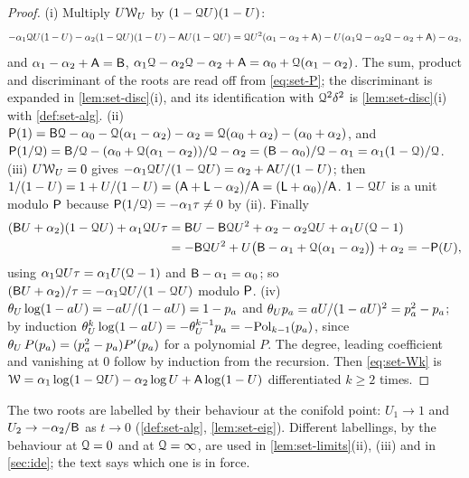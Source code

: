 \begin{proof}
(i) Multiply $U\mathcal{W}_U$ by $(1-\mathcal{Q} U)(1-U)$:
\[
-\alpha_1\mathcal{Q} U(1-U)-\alpha_2(1-\mathcal{Q} U)(1-U)-\mathsf{A} U(1-\mathcal{Q} U)
=\mathcal{Q} U^2(\alpha_1-\alpha_2+\mathsf{A})-U(\alpha_1\mathcal{Q}-\alpha_2\mathcal{Q}-\alpha_2+\mathsf{A})-\alpha_2 ,
\]
and $\alpha_1-\alpha_2+\mathsf{A}=\mathsf{B}$, $\alpha_1\mathcal{Q}-\alpha_2\mathcal{Q}-\alpha_2+\mathsf{A}=\alpha_0+\mathcal{Q}(\alpha_1-\alpha_2)$.  The sum, product and discriminant of the roots are read off from \eqref{eq:set-P}; the discriminant is expanded in \cref{lem:set-disc}(i), and its identification with $\mathcal{Q}^2\delta^2$ is \cref{lem:set-disc}(i) with \cref{def:set-alg}.
(ii) $\mathsf{P}(1)=\mathsf{B}\mathcal{Q}-\alpha_0-\mathcal{Q}(\alpha_1-\alpha_2)-\alpha_2=\mathcal{Q}(\alpha_0+\alpha_2)-(\alpha_0+\alpha_2)$, and $\mathsf{P}(1/\mathcal{Q})=\mathsf{B}/\mathcal{Q}-(\alpha_0+\mathcal{Q}(\alpha_1-\alpha_2))/\mathcal{Q}-\alpha_2=(\mathsf{B}-\alpha_0)/\mathcal{Q}-\alpha_1=\alpha_1(1-\mathcal{Q})/\mathcal{Q}$.
(iii) $U\mathcal{W}_U=0$ gives $-\alpha_1\mathcal{Q} U/(1-\mathcal{Q} U)=\alpha_2+\mathsf{A} U/(1-U)$; then $1/(1-U)=1+U/(1-U)=(\mathsf{A}+\mathsf{L}-\alpha_2)/\mathsf{A}=(\mathsf{L}+\alpha_0)/\mathsf{A}$. $1-\mathcal{Q} U$ is a unit modulo $\mathsf{P}$ because $\mathsf{P}(1/\mathcal{Q})=-\alpha_1\tau\neq0$ by (ii). Finally
\begin{align*}
(\mathsf{B} U+\alpha_2)(1-\mathcal{Q} U)+\alpha_1\mathcal{Q} U\tau&=\mathsf{B} U-\mathsf{B}\mathcal{Q} U^2+\alpha_2-\alpha_2\mathcal{Q} U+\alpha_1U(\mathcal{Q}-1)\\
&=-\mathsf{B}\mathcal{Q} U^2+U\big(\mathsf{B}-\alpha_1+\mathcal{Q}(\alpha_1-\alpha_2)\big)+\alpha_2=-\mathsf{P}(U),
\end{align*}
using $\alpha_1\mathcal{Q} U\tau=\alpha_1U(\mathcal{Q}-1)$ and $\mathsf{B}-\alpha_1=\alpha_0$; so $(\mathsf{B} U+\alpha_2)/\tau=-\alpha_1\mathcal{Q} U/(1-\mathcal{Q} U)$ modulo $\mathsf{P}$.
(iv) $\theta_{U}\log(1-aU)=-aU/(1-aU)=1-p_a$ and $\theta_{U} p_a=aU/(1-aU)^2=p_a^2-p_a$; by induction $\theta_{U}^k\log(1-aU)=-\theta_{U}^{k-1}p_a=-\mathrm{Pol}_{k-1}(p_a)$, since $\theta_{U}\,P(p_a)=(p_a^2-p_a)P'(p_a)$ for a polynomial $P$. The degree, leading coefficient and vanishing at $0$ follow by induction from the recursion. Then \eqref{eq:set-Wk} is $\mathcal{W}=\alpha_1\log(1-\mathcal{Q} U)-\alpha_2\log U+\mathsf{A}\log(1-U)$ differentiated $k\geq2$ times.
\end{proof}

The two roots are labelled by their behaviour at the conifold point: $U_1\to1$ and $U_2\to-\alpha_2/\mathsf{B}$ as $t\to0$ (\cref{def:set-alg}, \cref{lem:set-eig}). Different labellings, by the behaviour at $\mathcal{Q}=0$ and at $\mathcal{Q}=\infty$, are used in \cref{lem:set-limits}(ii), (iii) and in \cref{sec:ide}; the text says which one is in force.


